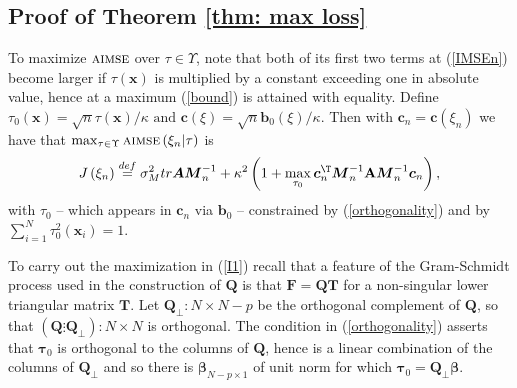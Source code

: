 \documentclass[times, authoryear, 12pt, twoside]{elsarticle}
\begin{document}
\subsection{Proof of Theorem \protect\ref{thm: max loss}}

To maximize $\textsc{aimse}$ over $\tau \in \Upsilon $, note that both of its
first two terms at (\ref{IMSEn}) become larger if $\tau \left( \boldsymbol{x}\right) $
is multiplied by a constant exceeding one in absolute value, hence at a
maximum (\ref{bound}) is attained with equality. Define $
\tau _{0}\left( \boldsymbol{x}\right) =\sqrt{n}\tau \left( \boldsymbol{x}\right) /\kappa \text{ and } \boldsymbol{c} \left( \xi \right) = \sqrt{n} \boldsymbol{b}_0 \left( \xi \right) / \kappa.
$
Then with $\boldsymbol{c}_{n}=\boldsymbol{c}\left( \xi _{n}\right) $ we have that $\max_{\tau \in \Upsilon } \textsc{aimse} \left( \xi _{n}|\tau \right) $  is
\begin{equation}
J\left( \xi _{n}\right) \overset{%
def}{=}\sigma _{M}^{2}tr\boldsymbol{AM}_{n}^{-1}+\kappa
^{2}\left( 1+\max_{\tau _{0}}\boldsymbol{c}_{n}^{\T }\boldsymbol{M}%
_{n}^{-1}\mathbf{A}\boldsymbol{M}_{n}^{-1}\boldsymbol{c}_{n}\right) ,
\label{I1}
\end{equation}%
with $\tau _{0}$ -- which appears in $\boldsymbol{c}_{n}$ via 
$\boldsymbol{b}_{0}$ -- constrained by (\ref{orthogonality}) and by $%
\sum_{i=1}^{N}\tau _{0}^{2}\left( \boldsymbol{x}_{i}\right) =1$.

To carry out the maximization in (\ref{I1}) recall that a feature of the
Gram-Schmidt process used in the construction of $\boldsymbol{Q}$ is that $%
\boldsymbol{F}=\boldsymbol{QT}$ for a non-singular lower triangular matrix $%
\boldsymbol{T}$. Let $\boldsymbol{Q}_{\boldsymbol{\perp }}:N\times N-p$ be
the orthogonal complement of $\boldsymbol{Q}$, so that $\left( \boldsymbol{Q}%
\vdots \boldsymbol{Q}_{\boldsymbol{\perp }}\right) :N\times N$ is
orthogonal. The condition in (\ref{orthogonality}) asserts that $\boldsymbol{\tau }%
_{0}$ is orthogonal to the columns of $\boldsymbol{Q}$, hence is a linear
combination of the columns of $\boldsymbol{Q}_{\boldsymbol{\perp }}$ and so
there is $\boldsymbol{\beta }_{N-p\times 1}$ of unit norm for which $%
\boldsymbol{\tau }_{0}=\boldsymbol{Q}_{\boldsymbol{\perp }}\boldsymbol{\beta 
}$.
\end{document}
